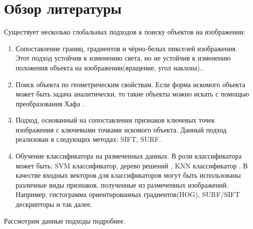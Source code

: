 \section{Обзор литературы}
\label{obzor}
Существует несколько глобальных подходов к поиску объектов на изображении:
\begin{enumerate}
	\item Сопоставление границ, градиентов и чёрно-белых пикселей изображения. Этот подход устойчив к изменению света, но не устойчив к изменению положения объекта на изображении(вращение, угол наклона).\cite{b:edge_match}.
	\item Поиск объекта по геометрическим свойствам. Если форма искомого объекта может быть задача аналитически, то такие объекты можно искать с помощью преобразования Хафа \cite{b:hough_transform}.
	\item Подход, основанный на сопоставлении признаков ключевых точек изображения с ключевыми точками искомого объекта. Данный подход реализован в следующих методах: SIFT\cite{b:SIFT}, SURF\cite{b:SURF}.
	\item Обучение классификатора на размеченных данных. В роли классификатора может быть: SVM классификатор\cite{b:SVM}, дерево решений \cite{b:decision_tree}, KNN классификатор \cite{b:knn}. В качестве входных векторов для классификаторов могут быть использованы различные виды признаков, полученные из размеченных изображений. 
	Например, гистограмма ориентированных градиентов(HOG)\cite{b:HOG},
	SURF\cite{b:SIFT}/SIFT\cite{b:SURF} дескрипторы и так далее. 
\end{enumerate}
Рассмотрим данные подходы подробнее.
